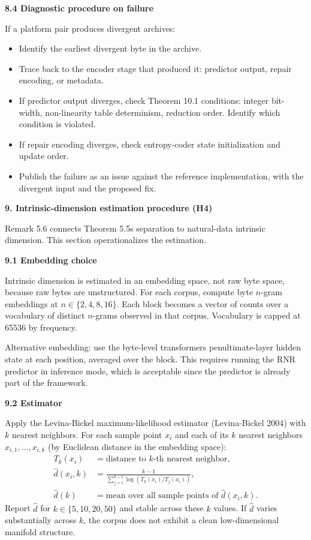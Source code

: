 \documentclass[
]{article}
\begin{document}
\textbf{8.4 Diagnostic procedure on failure}

If a platform pair produces divergent archives:

\begin{itemize}
\item
  Identify the earliest divergent byte in the archive.
\item
  Trace back to the encoder stage that produced it: predictor output,
  repair encoding, or metadata.
\item
  If predictor output diverges, check Theorem 10.1 conditions: integer
  bit-width, non-linearity table determinism, reduction order. Identify
  which condition is violated.
\item
  If repair encoding diverges, check entropy-coder state initialization
  and update order.
\item
  Publish the failure as an issue against the reference implementation,
  with the divergent input and the proposed fix.
\end{itemize}

\textbf{9. Intrinsic-dimension estimation procedure (H4)}

Remark 5.6 connects Theorem 5.5\textquotesingle s separation to
natural-data intrinsic dimension. This section operationalizes the
estimation.

\textbf{9.1 Embedding choice}

Intrinsic dimension is estimated in an embedding space, not raw
byte space, because raw bytes are unstructured. For each corpus,
compute byte $n$-gram embeddings at $n \in \{2, 4, 8, 16\}$. Each
block becomes a vector of counts over a vocabulary of distinct
$n$-grams observed in that corpus. Vocabulary is capped at 65536 by
frequency.

Alternative embedding: use the byte-level transformer\textquotesingle s
penultimate-layer hidden state at each position, averaged over the
block. This requires running the RNR predictor in inference mode, which
is acceptable since the predictor is already part of the framework.

\textbf{9.2 Estimator}

Apply the Levina-Bickel maximum-likelihood estimator (Levina-Bickel
2004) with $k$ nearest neighbors. For each sample point $x_i$ and
each of its $k$ nearest neighbors $x_{i,1}, \ldots, x_{i,k}$ (by
Euclidean distance in the embedding space):
\[
\begin{aligned}
T_k(x_i)         &= \text{distance to $k$-th nearest neighbor,} \\
\hat{d}(x_i, k)  &= \frac{k - 1}{\sum_{j=1}^{k-1} \log(T_k(x_i) / T_j(x_i))}, \\
\hat{d}(k)       &= \text{mean over all sample points of } \hat{d}(x_i, k).
\end{aligned}
\]
Report $\hat{d}$ for $k \in \{5, 10, 20, 50\}$ and stable across
these $k$ values. If $\hat{d}$ varies substantially across $k$, the
corpus does not exhibit a clean low-dimensional manifold structure.
\end{document}
